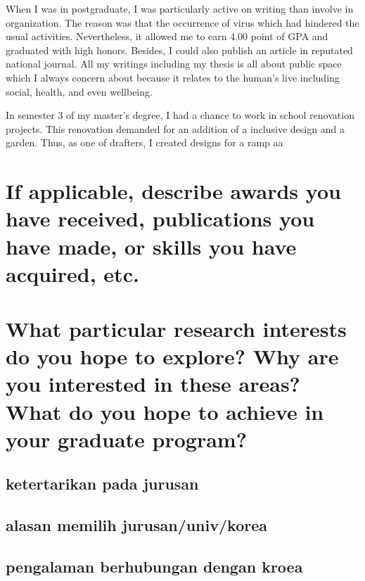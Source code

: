 \documentclass[11pt]{simart} %
\begin{document}
When I was in postgraduate, I was particularly active on writing than involve in organization. The reason was that the occurrence of virus which had hindered the usual activities. Nevertheless, it allowed me to earn 4.00 point of GPA and graduated with high honors. Besides, I could also publish an article in reputated national journal. All my writings including my thesis is all about public space which I always concern about because it relates to the human's live including social, health, and even wellbeing.

In semester 3 of my master's degree, I had a chance to work in school renovation projects. This renovation demanded for an addition of a inclusive design and a garden. Thus, as one of drafters, I created designs for a ramp aa

\section{If applicable, describe awards you have received, publications you have made, or skills you have acquired, etc.}

\section{What particular research interests do you hope to explore? Why are you interested in these areas? What do you hope to achieve in your graduate program?}
\subsection{ketertarikan pada jurusan}
\subsection{alasan memilih jurusan/univ/korea}
\subsection{pengalaman berhubungan dengan kroea}
















%

%
\end{document}
